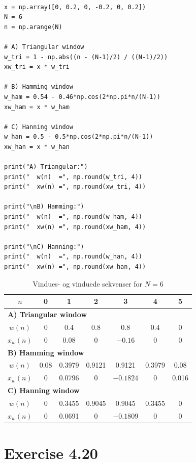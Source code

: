 \documentclass[12pt,a4paper]{article}
\begin{document}
\begin{verbatim}

x = np.array([0, 0.2, 0, -0.2, 0, 0.2])
N = 6
n = np.arange(N)

# A) Triangular window
w_tri = 1 - np.abs((n - (N-1)/2) / ((N-1)/2))
xw_tri = x * w_tri

# B) Hamming window
w_ham = 0.54 - 0.46*np.cos(2*np.pi*n/(N-1))
xw_ham = x * w_ham

# C) Hanning window
w_han = 0.5 - 0.5*np.cos(2*np.pi*n/(N-1))
xw_han = x * w_han

print("A) Triangular:")
print("  w(n)  =", np.round(w_tri, 4))
print("  xw(n) =", np.round(xw_tri, 4))

print("\nB) Hamming:")
print("  w(n)  =", np.round(w_ham, 4))
print("  xw(n) =", np.round(xw_ham, 4))

print("\nC) Hanning:")
print("  w(n)  =", np.round(w_han, 4))
print("  xw(n) =", np.round(xw_han, 4))

\end{verbatim}

\begin{table}[h]
\centering
\renewcommand{\arraystretch}{1.3}
\begin{tabular}{c|cccccc}
\hline
$n$ & 0 & 1 & 2 & 3 & 4 & 5 \\
\hline
\multicolumn{7}{l}{\textbf{A) Triangular window}} \\
\hline
$w(n)$  & 0 & 0.4 & 0.8 & 0.8 & 0.4 & 0 \\
$x_w(n)$ & 0 & 0.08 & 0 & $-0.16$ & 0 & 0 \\
\hline
\multicolumn{7}{l}{\textbf{B) Hamming window}} \\
\hline
$w(n)$  & 0.08 & 0.3979 & 0.9121 & 0.9121 & 0.3979 & 0.08 \\
$x_w(n)$ & 0 & 0.0796 & 0 & $-0.1824$ & 0 & 0.016 \\
\hline
\multicolumn{7}{l}{\textbf{C) Hanning window}} \\
\hline
$w(n)$  & 0 & 0.3455 & 0.9045 & 0.9045 & 0.3455 & 0 \\
$x_w(n)$ & 0 & 0.0691 & 0 & $-0.1809$ & 0 & 0 \\
\hline
\end{tabular}
\caption{Vindues- og vinduede sekvenser for $N=6$}
\end{table}
 
 \section*{Exercise 4.20}
\end{document}
